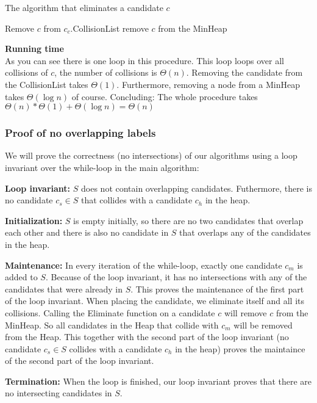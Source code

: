 \documentclass[crop=false,a4paper,oneside,11pt]{article}
\begin{document}
\begin{algorithm}[H]
\caption{The algorithm that eliminates a candidate $c$}
\begin{algorithmic}[1]
\State Remove $c$ from $c_c.$CollisionList 
\EndFor
\State remove $c$ from the MinHeap
\EndProcedure
\end{algorithmic}
\end{algorithm}
\textbf{Running time}\\
As you can see there is one loop in this procedure. This loop loops over all collisions of $c$, the number of collisions is $\Theta(n)$. Removing the candidate from the CollisionList takes $\Theta(1)$. Furthermore, removing a node from a MinHeap takes $\Theta(\log n)$ of course. Concluding: The whole procedure takes $\Theta(n)*\Theta(1)+\Theta(\log n)=\Theta(n)$

\subsubsection{Proof of no overlapping labels}
We will prove the correctness (no intersections) of our algorithms using a loop invariant over the while-loop in the main algorithm:

\textbf{Loop invariant:} $S$ does not contain overlapping candidates. Futhermore, there is no candidate $c_s\in S$ that collides with a candidate $c_h$ in the heap.

\textbf{Initialization:} $S$ is empty initially, so there are no two candidates that overlap each other and there is also no candidate in $S$ that overlaps any of the candidates in the heap.

\textbf{Maintenance:} In every iteration of the while-loop, exactly one candidate $c_m$ is added to $S$. Because of the loop invariant, it has no intersections with any of the candidates that were already in $S$. This proves the maintenance of the first part of the loop invariant. When placing the candidate, we eliminate itself and all its collisions. Calling the Eliminate function on a candidate $c$ will remove $c$ from the MinHeap. So all candidates in the Heap that collide with $c_m$ will be removed from the Heap. This together with the second part of the loop invariant (no candidate $c_s\in S$ collides with a candidate $c_h$ in the heap) proves the maintaince of the second part of the loop invariant.

\textbf{Termination:} When the loop is finished, our loop invariant proves that there are no intersecting candidates in $S$.
\end{document}
